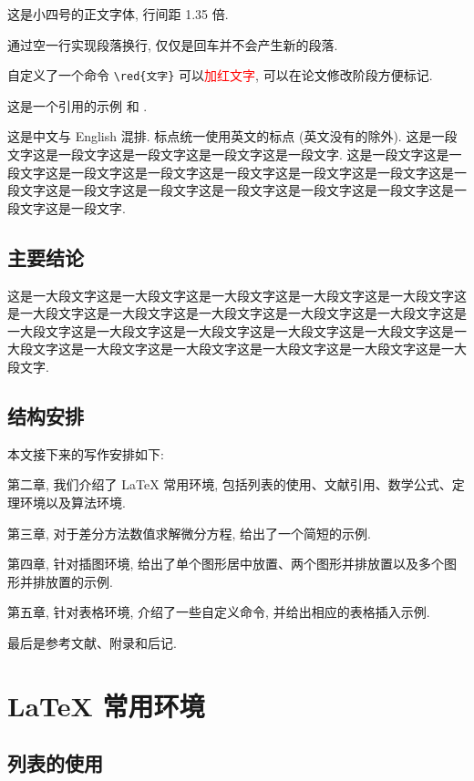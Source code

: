 \documentclass[UTF8,openany,twoside,12pt]{ctexbook}
\theoremstyle{plain}
\newcommand{\red}[1]{\textcolor{red}{#1}}
\begin{document}
这是小四号的正文字体, 行间距 1.35 倍.

通过空一行实现段落换行, 仅仅是回车并不会产生新的段落.

自定义了一个命令 \verb|\red{文字}| 可以\red{加红文字}, 可以在论文修改阶段方便标记.

这是一个引用的示例 \cite{Tadmor2012} 和 \cite{LiLiu1997,Adams2003,TreWei2014}.

这是中文与 English 混排. 标点统一使用英文的标点 (英文没有的除外). 这是一段文字这是一段文字这是一段文字这是一段文字这是一段文字. 这是一段文字这是一段文字这是一段文字这是一段文字这是一段文字这是一段文字这是一段文字这是一段文字这是一段文字这是一段文字这是一段文字这是一段文字这是一段文字这是一段文字这是一段文字.

\section{主要结论}

这是一大段文字这是一大段文字这是一大段文字这是一大段文字这是一大段文字这是一大段文字这是一大段文字这是一大段文字这是一大段文字这是一大段文字这是一大段文字这是一大段文字这是一大段文字这是一大段文字这是一大段文字这是一大段文字这是一大段文字这是一大段文字这是一大段文字这是一大段文字这是一大段文字.


\section{结构安排}

本文接下来的写作安排如下:

第二章, 我们介绍了 LaTeX 常用环境, 包括列表的使用、文献引用、数学公式、定理环境以及算法环境.

第三章, 对于差分方法数值求解微分方程, 给出了一个简短的示例.

第四章, 针对插图环境, 给出了单个图形居中放置、两个图形并排放置以及多个图形并排放置的示例.

第五章, 针对表格环境, 介绍了一些自定义命令, 并给出相应的表格插入示例.

最后是参考文献、附录和后记.




\chapter{LaTeX 常用环境}

\section{列表的使用}
\end{document}

